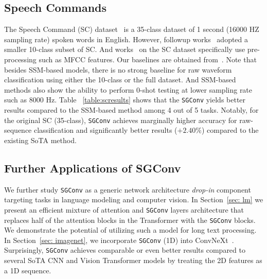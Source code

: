 \subsection{Speech Commands} The Speech Command (SC) dataset~\citep{warden2018speech} is a 35-class dataset of 1 second (16000 HZ sampling rate) spoken words in English. However, followup works~\citep{kidger2020neural,gu2021combining,romero2021ckconv,romero2021flexconv} adopted a smaller 10-class subset of SC. And works~\citep{romero2021flexconv,gu2021combining} on the SC dataset specifically use pre-processing such as MFCC features. Our baselines are obtained from~\citep{gu2021efficiently,gu2022parameterization}. Note that besides SSM-based models, there is no strong baseline for raw waveform classification using either the 10-class or the full dataset. And SSM-based methods also show the ability to perform 0-shot testing at lower sampling rate such as 8000 Hz. Table ~\ref{table:scresults} shows that the \texttt{SGConv} yields better results compared to the SSM-based method among 4 out of 5 tasks. Notably, for the original SC (35-class), \texttt{SGConv} achieves marginally higher accuracy for raw-sequence classification and significantly better results ($+2.40\%$) compared to the existing SoTA method.

\addtocounter{footnote}{-1}

\addtocounter{footnote}{1}

\subsection{Further Applications of SGConv} We further study \texttt{SGConv} as a generic network architecture \emph{drop-in} component targeting tasks in language modeling and computer vision. In Section~\ref{sec: lm} we present an efficient mixture of attention and \texttt{SGConv} layers architecture that replaces half of the attention blocks in the Transformer with the \texttt{SGConv} blocks. We demonstrate the potential of utilizing such a model for long text processing. In Section~\ref{sec: imagenet}, we incorporate \texttt{SGConv} (1D) into ConvNeXt~\citep{liu2022convnet}. Surprisingly, \texttt{SGConv} achieves comparable or even better results compared to several SoTA CNN and Vision Transformer models by treating the 2D features as a 1D sequence.

